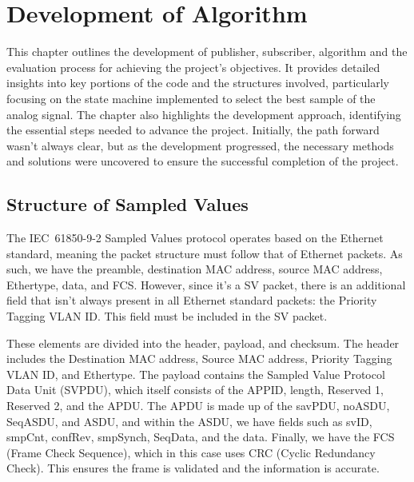 
\chapter{Development of Algorithm} %

\label{chap:Chapter5} %

This chapter outlines the development of publisher, subscriber, algorithm and the evaluation process for achieving the project’s objectives. It provides detailed insights into key portions of the code and the structures involved, particularly focusing on the state machine implemented to select the best sample of the analog signal. The chapter also highlights the development approach, identifying the essential steps needed to advance the project. Initially, the path forward wasn't always clear, but as the development progressed, the necessary methods and solutions were uncovered to ensure the successful completion of the project.

\section{Structure of Sampled Values}

\label{sec:Structure_of_Sampled_Values}
The IEC~61850-9-2 Sampled Values protocol operates based on the Ethernet standard, meaning the packet structure must follow that of Ethernet packets. As such, we have the preamble, destination MAC address, source MAC address, Ethertype, data, and FCS. However, since it's a SV packet, there is an additional field that isn't always present in all Ethernet standard packets: the Priority Tagging VLAN ID. This field must be included in the SV packet.

These elements are divided into the header, payload, and checksum. The header includes the Destination MAC address, Source MAC address, Priority Tagging VLAN ID, and Ethertype. The payload contains the Sampled Value Protocol Data Unit (SVPDU), which itself consists of the APPID, length, Reserved 1, Reserved 2, and the APDU. The APDU is made up of the savPDU, noASDU, SeqASDU, and ASDU, and within the ASDU, we have fields such as svID, smpCnt, confRev, smpSynch, SeqData, and the data. Finally, we have the FCS (Frame Check Sequence), which in this case uses CRC (Cyclic Redundancy Check). This ensures the frame is validated and the information is accurate.

